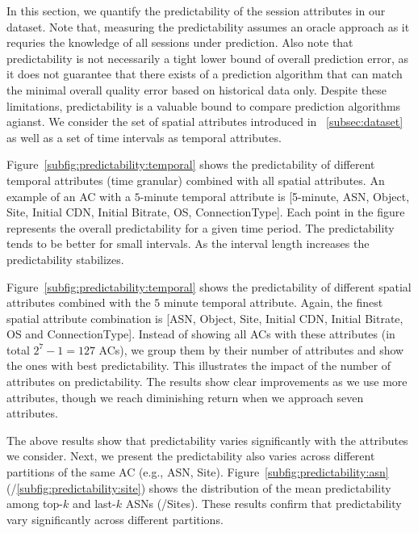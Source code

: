 In this section, we quantify the predictability of the session attributes in our dataset. Note that, measuring the predictability assumes an oracle approach as it requries the knowledge of all sessions under prediction. Also note that predictability is not necessarily a tight lower bound of overall prediction error, as it does not guarantee that there exists of a prediction algorithm that can match the minimal overall quality error based on historical data only. Despite these limitations, predictability is a valuable bound to compare prediction algorithms agianst. We consider the set of spatial attributes introduced in \Section~\ref{subsec:dataset} as well as a set of time intervals as temporal attributes.

 Figure~\ref{subfig:predictability:temporal} shows the predictability of different temporal attributes (time granular) combined with all spatial attributes. An example of an AC with a $5$-minute temporal attribute is [5-minute, ASN, Object, Site, Initial CDN, Initial Bitrate, OS, ConnectionType]. Each point in the figure represents the overall predictability for a given time period. The predictability tends to be better for small intervals. As the interval length increases the predictability stabilizes.

 Figure~\ref{subfig:predictability:temporal} shows the predictability of different spatial attributes combined with the $5$ minute temporal attribute. Again, the finest spatial attribute combination is [ASN, Object, Site, Initial CDN, Initial Bitrate, OS and ConnectionType].  Instead of showing all ACs with these attributes (in total $2^7-1=127$ ACs), we group them by their number of attributes and show the ones with best predictability. This illustrates the impact of the number of attributes on predictability. The results show clear improvements as we use more attributes, though we reach diminishing return when we approach seven attributes.

 The above results show that predictability varies significantly with the attributes we consider. Next, we present the predictability also varies across different partitions of the same AC (e.g., ASN, Site). Figure~\ref{subfig:predictability:asn} (/\ref{subfig:predictability:site}) shows the distribution of the mean predictability among top-$k$ and last-$k$ ASNs (/Sites). These results confirm that predictability vary significantly across different partitions. 



